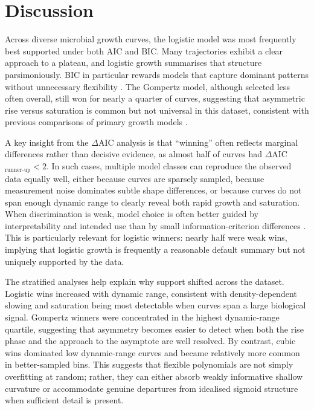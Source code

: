 \documentclass[11pt]{article}
\begin{document}
\section*{Discussion}
Across diverse microbial growth curves, the logistic model was most frequently best supported under both AIC and BIC. Many trajectories exhibit a clear approach to a plateau, and logistic growth summarises that structure parsimoniously. BIC in particular rewards models that capture dominant patterns without unnecessary flexibility \citep{Schwarz1978,Raftery1995}. The Gompertz model, although selected less often overall, still won for nearly a quarter of curves, suggesting that asymmetric rise versus saturation is common but not universal in this dataset, consistent with previous comparisons of primary growth models \citep{Zwietering1990,Buchanan1997}.

A key insight from the \(\Delta\)AIC analysis is that ``winning'' often reflects marginal differences rather than decisive evidence, as almost half of curves had \(\Delta\)AIC\(_{\text{runner-up}}<2\). In such cases, multiple model classes can reproduce the observed data equally well, either because curves are sparsely sampled, because measurement noise dominates subtle shape differences, or because curves do not span enough dynamic range to clearly reveal both rapid growth and saturation. When discrimination is weak, model choice is often better guided by interpretability and intended use than by small information-criterion differences \citep{BurnhamAnderson2002,JohnsonOmland2004}. This is particularly relevant for logistic winners: nearly half were weak wins, implying that logistic growth is frequently a reasonable default summary but not uniquely supported by the data.

The stratified analyses help explain why support shifted across the dataset. Logistic wins increased with dynamic range, consistent with density-dependent slowing and saturation being most detectable when curves span a large biological signal. Gompertz winners were concentrated in the highest dynamic-range quartile, suggesting that asymmetry becomes easier to detect when both the rise phase and the approach to the asymptote are well resolved. By contrast, cubic wins dominated low dynamic-range curves and became relatively more common in better-sampled bins. This suggests that flexible polynomials are not simply overfitting at random; rather, they can either absorb weakly informative shallow curvature or accommodate genuine departures from idealised sigmoid structure when sufficient detail is present.
\end{document}
